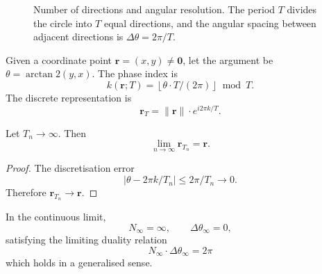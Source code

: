 \begin{figure}[htbp]
    \centering
    \caption{Number of directions and angular resolution. The period $T$ divides the circle into $T$ equal directions, and the angular spacing between adjacent directions is $\Delta\theta=2\pi/T$.}
    \label{fig:direction_resolution}
\end{figure}

\begin{definition}\label{def:coordinate_by_width_bandwidth}
Given a coordinate point $\mathbf{r} = (x, y) \neq \mathbf{0}$, let the argument be $\theta = \arctan2(y, x)$. The phase index is
\[
k(\mathbf{r}; T) = \left\lfloor \theta \cdot T / (2\pi) \right\rfloor \bmod T.
\]
The discrete representation is
\[
\mathbf{r}_T = \|\mathbf{r}\| \cdot e^{i2\pi k/T}.
\]
\end{definition}

\begin{theorem}\label{thm:discrete_to_continuous_limit}
Let $T_n \to \infty$. Then
\[
\lim_{n \to \infty} \mathbf{r}_{T_n} = \mathbf{r}.
\]
\end{theorem}

\begin{proof}
The discretisation error
\[
|\theta - 2\pi k/T_n| \le 2\pi/T_n \to 0.
\]
Therefore $\mathbf{r}_{T_n}\to \mathbf{r}$.
\end{proof}

\begin{definition}\label{def:continuous_width_bandwidth}
In the continuous limit,
\[
N_{\infty} = \infty, \qquad \Delta\theta_{\infty} = 0,
\]
satisfying the limiting duality relation
\[
N_{\infty} \cdot \Delta\theta_{\infty} = 2\pi
\]
which holds in a generalised sense.
\end{definition}

